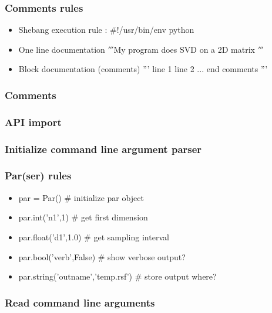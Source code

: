 \begin{frame}
\end{frame}

\begin{frame} \frametitle{Comments rules}
\begin{itemize}
\item Shebang execution rule   : $\#$!/usr/bin/env python
\item One line documentation        $'''$My program does SVD on a 2D matrix $'''$
\item Block documentation (comments)
''' line 1
	line 2
	... 
	end comments
'''
\end{itemize}
\end{frame}

\begin{frame} \frametitle{Comments}

\end{frame}

\begin{frame} \frametitle{API import}

\end{frame}

\begin{frame} \frametitle{Initialize command line argument parser}

\end{frame}

\begin{frame} \frametitle{Par(ser) rules}
\begin{itemize}
\item par = Par()                      $\#$ initialize par object
\item par.int('n1',1)                  $\#$ get first dimension              
\item par.float('d1',1.0)              $\#$ get sampling interval        
\item par.bool('verb',False)           $\#$ show verbose output?         
\item par.string('outname','temp.rsf') $\#$ store output where?
\end{itemize}
\end{frame}

\begin{frame} \frametitle{Read command line arguments}

\end{frame}

